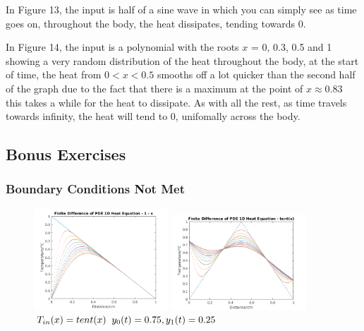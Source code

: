\documentclass[11pt,a4paper]{article}
\begin{document}
In Figure 13, the input is half of a sine wave in which you can simply see as time goes on, throughout the body, the heat dissipates, tending towards 0.

\vspace{4mm}In Figure 14, the input is a polynomial with the roots $x$ = 0, 0.3, 0.5 and 1 showing a very random distribution of the heat throughout the body, at the start of time, the heat from $0 < x < 0.5$ smooths off a lot quicker than  the second half of the graph due to the fact that there is a maximum at the point of $x \approx 0.83$ this takes a while for the heat to dissipate. As with all the rest, as time travels towards infinity, the heat will tend to 0, unifomally across the body.

\vspace{40mm}
\subsection{Bonus Exercises}
\subsubsection{Boundary Conditions Not Met}

\begin{figure}
	\vspace{-10mm}
	\includegraphics[width=0.45\textwidth]{Ex4_Figs/1-xbcdiff.png}
	\vspace{-3mm}
	\caption{$T_{in}(x)= 1-x$}
	\label{fig:bcnm}
		\includegraphics[width=0.45\textwidth]{Ex4_Figs/Tentbc.png}
		\vspace{-3mm}
	\caption{$T_{in}(x)= tent(x) \hspace{2mm} y_0(t) = 0.75, y_1(t) = 0.25$}
	\label{fig:bmsn2}
\end{figure}
\end{document}
